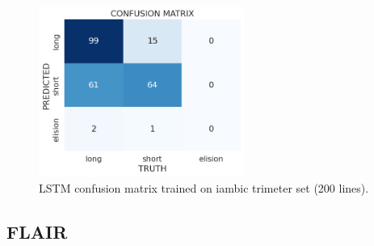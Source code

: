 \begin{figure}[H]
    \centering
    \includegraphics[width=0.6\textwidth]{img/lstm/lstm_confusion_matrix_trimeter_model.png}

    \caption{LSTM confusion matrix trained on iambic trimeter set (200 lines).}
    \label{fig:exp_architecture}
\end{figure}

\subsection{FLAIR}
